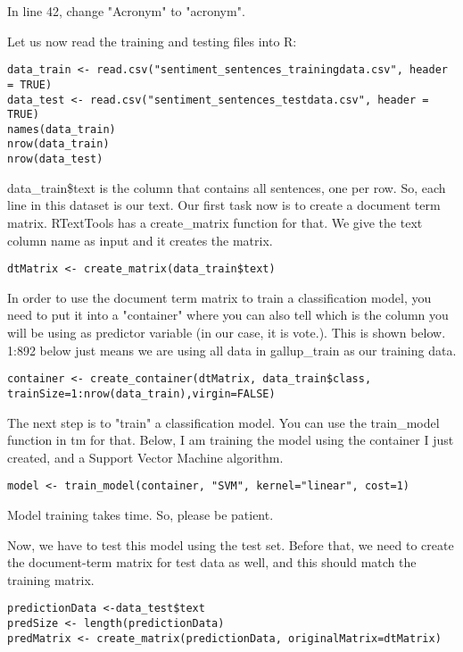 \documentclass[11pt,a4paper]{article}
\begin{document}
In line 42, change "Acronym" to "acronym".

Let us now read the training and testing files into R:
\begin{lstlisting}
data_train <- read.csv("sentiment_sentences_trainingdata.csv", header = TRUE)
data_test <- read.csv("sentiment_sentences_testdata.csv", header = TRUE)
names(data_train)
nrow(data_train)
nrow(data_test)
\end{lstlisting}

data\_train\$text is the column that contains all sentences, one per row. So, each line in this dataset is our text. Our first task now is to create a document term matrix. RTextTools has a create\_matrix function for that. We give the text column name as input and it creates the matrix.

\begin{lstlisting}
dtMatrix <- create_matrix(data_train$text)
\end{lstlisting}

In order to use the document term matrix to train a classification model, you need to put it into a "container" where you can also tell which is the column you will be using as predictor variable (in our case, it is vote.). This is shown below. 1:892 below just means we are using all data in gallup\_train as our training data. 

\begin{lstlisting}
container <- create_container(dtMatrix, data_train$class, trainSize=1:nrow(data_train),virgin=FALSE)
\end{lstlisting}

The next step is to "train" a classification model. You can use the train\_model function in tm for that. Below, I am training the model using the container I just created, and a Support Vector Machine algorithm. 
\begin{lstlisting}
model <- train_model(container, "SVM", kernel="linear", cost=1)
\end{lstlisting}

Model training takes time. So, please be patient. 

Now, we have to test this model using the test set. Before that, we need to create the document-term matrix for test data as well, and this should match the training matrix.

\begin{lstlisting}
predictionData <-data_test$text
predSize <- length(predictionData)
predMatrix <- create_matrix(predictionData, originalMatrix=dtMatrix)
\end{lstlisting}
\end{document}
